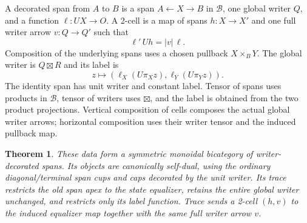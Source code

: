 \documentclass[11pt]{article}
\newtheorem{theorem}{Theorem}\newtheorem{proposition}[theorem]{Proposition}
\begin{document}
A decorated span from $A$ to $B$ is a span $A\leftarrow X\to B$ in $\mathcal B$, one global writer $Q$, and a function $\ell:UX\to O$. A 2-cell is a map of spans $h:X\to X'$ and one full writer arrow $v:Q\to Q'$ such that
\[
 \ell'\,Uh=|v|\,\ell.
\]
Composition of the underlying spans uses a chosen pullback $X\times_B Y$. The global writer is $Q\boxtimes R$ and its label is
\[
 z\longmapsto(\ell_X(U\pi_X z),\ell_Y(U\pi_Y z)).
\]
The identity span has unit writer and constant label. Tensor of spans uses products in $\mathcal B$, tensor of writers uses $\boxtimes$, and the label is obtained from the two product projections. Vertical composition of cells composes the actual global writer arrows; horizontal composition uses their writer tensor and the induced pullback map.

\begin{theorem}
These data form a symmetric monoidal bicategory of writer-decorated spans. Its objects are canonically self-dual, using the ordinary diagonal/terminal span cups and caps decorated by the unit writer. Its trace restricts the old span apex to the state equalizer, retains the entire global writer unchanged, and restricts only its label function. Trace sends a 2-cell $(h,v)$ to the induced equalizer map together with the same full writer arrow $v$.
\end{theorem}
\end{document}

